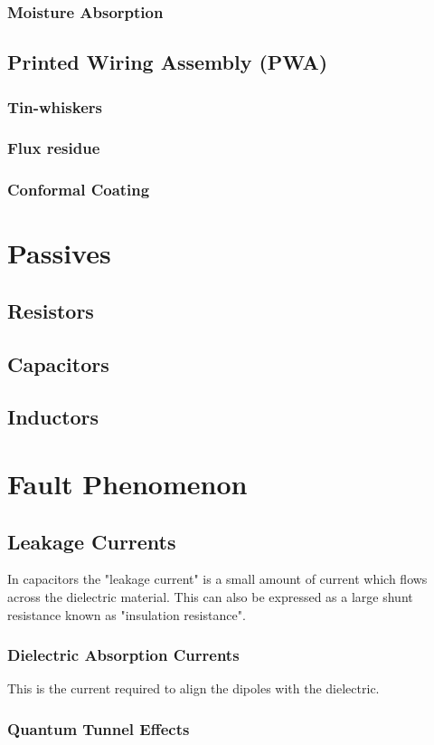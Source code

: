 \documentclass{article}
\begin{document}
		\subsubsection{Moisture Absorption}

	\subsection{Printed Wiring Assembly (PWA)}
		\subsubsection{Tin-whiskers}
		\subsubsection{Flux residue}
		\subsubsection{Conformal Coating}

\newpage

\section{Passives}
	\subsection{Resistors}
	
	\subsection{Capacitors}
	
	\subsection{Inductors}
	
\newpage

\section{Fault Phenomenon}
	\subsection{Leakage Currents}
	In capacitors the "leakage current" is a small amount of current which flows across the dielectric material. This can also be expressed as a large shunt resistance known as "insulation resistance".
	
	\subsubsection{Dielectric Absorption Currents}
	This is the current required to align the dipoles with the dielectric.
	
	\subsubsection{Quantum Tunnel Effects}


\newpage

\printbibliography
\end{document}
